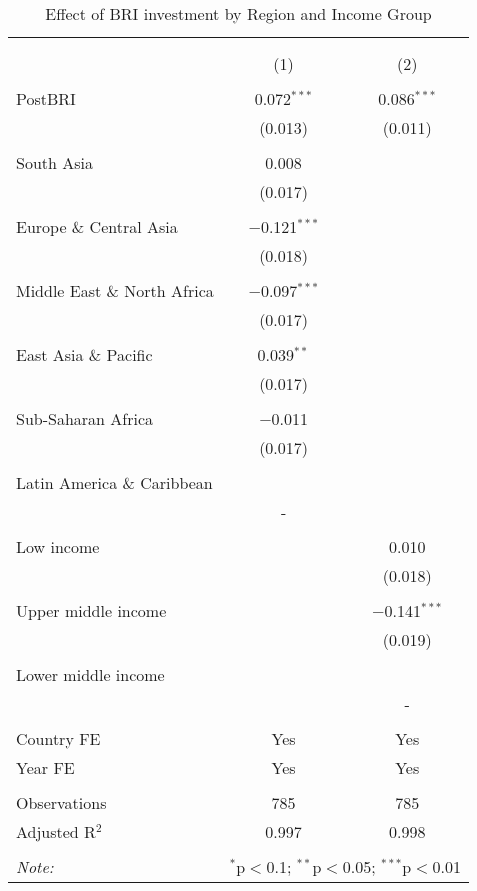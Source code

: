 \documentclass[10pt,a4paper]{article}
\begin{document}
\begin{table}[!htbp] \centering
  \caption{{Effect of BRI investment by Region and Income Group}}
  \label{tab:region}
\begin{tabular}{@{\extracolsep{5pt}}lcc}
\\[-1.8ex]\hline
\hline \\[-1.8ex]
\\[-1.8ex] & (1) & (2)\\
\hline \\[-1.8ex]
 PostBRI & 0.072$^{***}$ & 0.086$^{***}$ \\
  & (0.013) & (0.011) \\
  & & \\
 South Asia & 0.008 &  \\
  & (0.017) &  \\
  & & \\
 Europe \& Central Asia & $-$0.121$^{***}$ &  \\
  & (0.018) &  \\
  & & \\
 Middle East \& North Africa & $-$0.097$^{***}$ &  \\
  & (0.017) &  \\
  & & \\
 East Asia \& Pacific & 0.039$^{**}$ &  \\
  & (0.017) &  \\
  & & \\
 Sub-Saharan Africa & $-$0.011 &  \\
  & (0.017) &  \\
  & & \\
 Latin America \& Caribbean &  &  \\
  & - &  \\
  & & \\


 Low income &  & 0.010 \\
  &  & (0.018) \\
  & & \\
 Upper middle income &  & $-$0.141$^{***}$ \\
  &  & (0.019) \\
  & & \\
 Lower middle income &  &  \\
  &  & - \\
  & & \\

Country FE & Yes & Yes \\
Year FE & Yes & Yes \\

\hline \\[-1.8ex]

Observations & 785 & 785 \\
Adjusted R$^{2}$ & 0.997 & 0.998 \\
\hline
\hline \\[-1.8ex]
\textit{Note:}  & \multicolumn{2}{r}{$^{*}$p$<$0.1; $^{**}$p$<$0.05; $^{***}$p$<$0.01} \\
\end{tabular}
\end{table}
\end{document}
